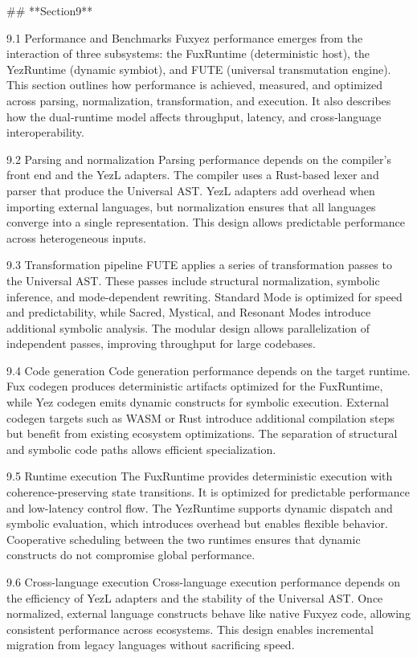 ## **Section9**

9.1 Performance and Benchmarks
Fuxyez performance emerges from the interaction of three subsystems: the FuxRuntime (deterministic host), the YezRuntime (dynamic symbiot), and FUTE (universal transmutation engine). This section outlines how performance is achieved, measured, and optimized across parsing, normalization, transformation, and execution. It also describes how the dual‑runtime model affects throughput, latency, and cross‑language interoperability.

9.2 Parsing and normalization
Parsing performance depends on the compiler’s front end and the YezL adapters. The compiler uses a Rust-based lexer and parser that produce the Universal AST. YezL adapters add overhead when importing external languages, but normalization ensures that all languages converge into a single representation. This design allows predictable performance across heterogeneous inputs.

9.3 Transformation pipeline
FUTE applies a series of transformation passes to the Universal AST. These passes include structural normalization, symbolic inference, and mode-dependent rewriting. Standard Mode is optimized for speed and predictability, while Sacred, Mystical, and Resonant Modes introduce additional symbolic analysis. The modular design allows parallelization of independent passes, improving throughput for large codebases.

9.4 Code generation
Code generation performance depends on the target runtime. Fux codegen produces deterministic artifacts optimized for the FuxRuntime, while Yez codegen emits dynamic constructs for symbolic execution. External codegen targets such as WASM or Rust introduce additional compilation steps but benefit from existing ecosystem optimizations. The separation of structural and symbolic code paths allows efficient specialization.

9.5 Runtime execution
The FuxRuntime provides deterministic execution with coherence-preserving state transitions. It is optimized for predictable performance and low-latency control flow. The YezRuntime supports dynamic dispatch and symbolic evaluation, which introduces overhead but enables flexible behavior. Cooperative scheduling between the two runtimes ensures that dynamic constructs do not compromise global performance.

9.6 Cross-language execution
Cross-language execution performance depends on the efficiency of YezL adapters and the stability of the Universal AST. Once normalized, external language constructs behave like native Fuxyez code, allowing consistent performance across ecosystems. This design enables incremental migration from legacy languages without sacrificing speed.

